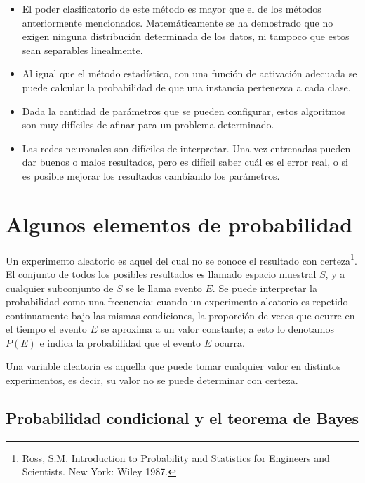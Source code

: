 \documentclass[a4paper, 11pt, oneside]{report}
\begin{document}
\begin{itemize}

	\item El poder clasificatorio de este método es mayor que el de los métodos anteriormente mencionados. Matemáticamente se ha demostrado que no exigen ninguna distribución determinada de los datos, ni tampoco que estos sean separables linealmente.

	\item Al igual que el método estadístico, con una función de activación adecuada se puede calcular la probabilidad de que una instancia pertenezca a cada clase.

	\item Dada la cantidad de parámetros que se pueden configurar, estos algoritmos son muy difíciles de afinar para un problema determinado.

	\item Las redes neuronales son difíciles de interpretar. Una vez entrenadas pueden dar buenos o malos resultados, pero es difícil saber cuál es el error real, o si es posible mejorar los resultados cambiando los parámetros.

\end{itemize}

\section{Algunos elementos de probabilidad}

Un experimento aleatorio es aquel del cual no se conoce el resultado con certeza\footnote{Ross, S.M. Introduction to Probability and Statistics for Engineers and Scientists. New York: Wiley 1987.}. El conjunto de todos los posibles resultados es llamado espacio muestral $S$, y a cualquier subconjunto de $S$ se le llama evento $E$. Se puede interpretar la probabilidad como una frecuencia: cuando un experimento aleatorio es repetido continuamente bajo las mismas condiciones, la proporción de veces que ocurre en el tiempo el evento $E$ se aproxima a un valor constante; a esto lo denotamos $P(E)$ e indica la probabilidad que el evento $E$ ocurra.

Una variable aleatoria es aquella que puede tomar cualquier valor en distintos experimentos, es decir, su valor no se puede determinar con certeza.

\subsection{Probabilidad condicional y el teorema de Bayes}
\end{document}
